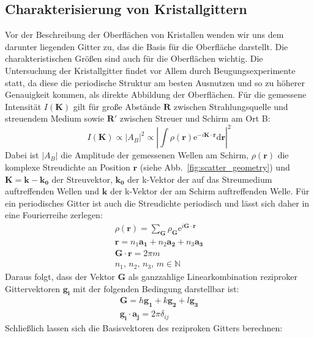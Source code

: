 \subsection{Charakterisierung von Kristallgittern}
Vor der Beschreibung der Oberflächen von Kristallen wenden wir uns dem darunter liegenden 
Gitter zu, das die Basis für die Oberfläche darstellt. Die charakteristischen Größen 
sind auch für die Oberflächen wichtig. Die Untersuchung der Kristallgitter findet vor 
Allem durch Beugungsexperimente statt, da diese die periodische Struktur am besten 
Ausnutzen und so zu höherer Genauigkeit kommen, als direkte Abbildung der Oberflächen. 
Für die gemessene Intensität $I(\mathbf{K})$ gilt für große Abstände $\mathbf{R}$ 
zwischen Strahlungsquelle und streuendem Medium sowie $\mathbf{R'}$ zwischen Streuer 
und Schirm am Ort B:
\begin{equation}
    I(\mathbf{K}) \propto |A_B|^2 \propto |\int \rho(\mathbf{r}) \mathrm{e}^{-i 
    \mathbf{K} \cdot \mathbf{r}} \mathrm{d}\mathbf{r}|^2
\end{equation}
Dabei ist $|A_B|$ die Amplitude der gemessenen Wellen am Schirm, $\rho (\mathbf{r})$ die 
komplexe Streudichte an Position $\mathbf{r}$ (siehe Abb.~\ref{fig:scatter_geometry}) 
und  $\mathbf{K} = \mathbf{k} - \mathbf{k_0}$ der Streuvektor, $\mathbf{k_0}$ der 
k-Vektor der auf das Streumedium auftreffenden Wellen und $\mathbf{k}$ der k-Vektor 
der am Schirm auftreffenden Welle. Für ein periodisches Gitter ist auch die Streudichte
periodisch und lässt sich daher in eine Fourierreihe zerlegen:
\begin{eqnarray}
    \rho(\mathbf{r}) = \sum_{\mathbf{G}} \rho_{\mathbf{G}} \mathrm{e}^{i \mathbf{G} 
        \cdot \mathbf{r}} \\
    \mathbf{r} = n_1 \mathbf{a_1} + n_2 \mathbf{a_2} + n_3 \mathbf{a_3} \\
    \mathbf{G} \cdot \mathbf{r}= 2 \pi m  \\
    n_1, \, n_2, \, n_3, \, m \in \mathbb{N}
\end{eqnarray}
Daraus folgt, dass der Vektor $\mathbf{G}$ als ganzzahlige Linearkombination 
reziproker Gittervektoren $\mathbf{g_i}$ mit der folgenden Bedingung darstellbar ist:
\begin{eqnarray}
    \mathbf{G} = h \mathbf{g_1} + k \mathbf{g_2} + l \mathbf{g_3} \\
    \mathbf{g_i} \cdot \mathbf{a_j} = 2 \pi \delta_{ij}
\end{eqnarray}
Schließlich lassen sich die Basisvektoren des reziproken Gitters berechnen:
